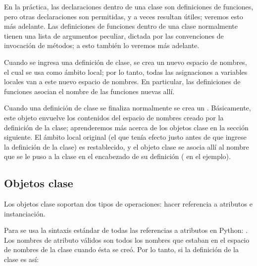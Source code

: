 \documentclass[a5paper,10pt,spanish]{sphinxmanual}
\begin{document}
\sphinxAtStartPar
En la práctica, las declaraciones dentro de una clase son definiciones de funciones, pero otras declaraciones son permitidas, y a veces resultan útiles; veremos esto más adelante.  Las definiciones de funciones dentro de una clase normalmente tienen una lista de argumentos peculiar, dictada por las convenciones de invocación de métodos; a esto también lo veremos más adelante.

\sphinxAtStartPar
Cuando se ingresa una definición de clase, se crea un nuevo espacio de nombres, el cual se usa como ámbito local; por lo tanto, todas las asignaciones a variables locales van a este nuevo espacio de nombres.  En particular, las definiciones de funciones asocian el nombre de las funciones nuevas allí.

\sphinxAtStartPar
Cuando una definición de clase se finaliza normalmente se crea un .  Básicamente, este objeto envuelve los contenidos del espacio de nombres creado por la definición de la clase; aprenderemos más acerca de los objetos clase en la sección siguiente.  El ámbito local original (el que tenía efecto justo antes de que ingrese la definición de la clase) es restablecido, y el objeto clase se asocia allí al nombre que se le puso a la clase en el encabezado de su definición ( en el ejemplo).


\subsection{Objetos clase}
\label{\detokenize{tutorial/classes:class-objects}}\label{\detokenize{tutorial/classes:tut-classobjects}}
\sphinxAtStartPar
Los objetos clase soportan dos tipos de operaciones: hacer referencia a atributos e instanciación.

\sphinxAtStartPar
Para  se usa la sintaxis estándar de todas las referencias a atributos en Python: .  Los nombres de atributo válidos son todos los nombres que estaban en el espacio de nombres de la clase cuando ésta se creó.  Por lo tanto, si la definición de la clase es así:

\begin{sphinxVerbatim}[commandchars=\\\{\}]
 
      

     
         
\end{sphinxVerbatim}
\end{document}
